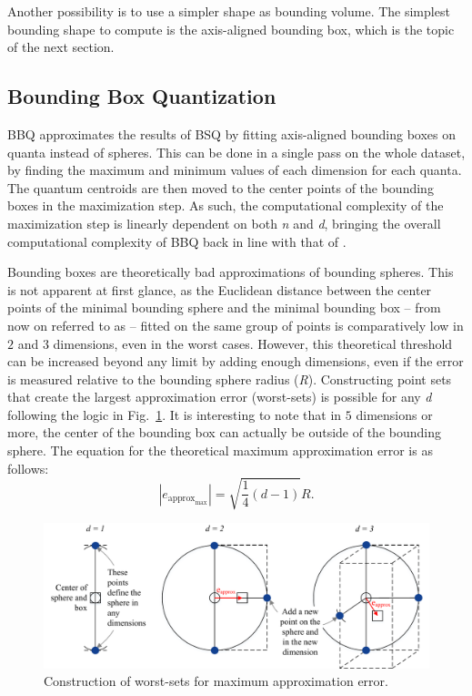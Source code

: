 			Another possibility is to use a simpler shape as bounding volume.
			The simplest bounding shape to compute is the axis-aligned bounding box, which is the topic of the next section.
			
		\subsection{Bounding Box Quantization}
			
			\ac{BBQ} approximates the results of \ac{BSQ} by fitting axis-aligned bounding boxes on quanta instead of spheres.
			This can be done in a single pass on the whole dataset, by finding the maximum and minimum values of each dimension for each quanta.
			The quantum centroids are then moved to the center points of the bounding boxes in the maximization step.
			As such, the computational complexity of the maximization step is linearly dependent on both \textit{n} and \textit{d}, bringing the overall computational complexity of \ac{BBQ} back in line with that of \kmeans{}.
			
			Bounding boxes are theoretically bad approximations of bounding spheres.
			This is not apparent at first glance, as the Euclidean distance between the center points of the minimal bounding sphere and the minimal bounding box -- from now on referred to as  -- fitted on the same group of points is comparatively low in $2$ and $3$ dimensions, even in the worst cases.
			However, this theoretical threshold can be increased beyond any limit by adding enough dimensions, even if the error is measured relative to the bounding sphere radius (\textit{R}). Constructing point sets that create the largest approximation error (worst-sets) is possible for any \textit{d} following the logic in Fig.~\ref{fig:boxworstsets}.
			It is interesting to note that in $5$ dimensions or more, the center of the bounding box can actually be outside of the bounding sphere.
			The equation for the theoretical maximum approximation error is as follows:
			\begin{equation}
				|e_{\text{approx}_{\text{max}}}| = \sqrt{\frac{1}{4}(d-1)} R.
			\end{equation}
			
			\begin{figure}[ht]
				\centering
				\includegraphics[width=\linewidth]{figures/03_quantization/worst_sets/worst_sets.pdf}
				\caption[BBQ worst-set construction]{Construction of worst-sets for maximum approximation error.}
				\label{fig:boxworstsets}
			\end{figure}
			

